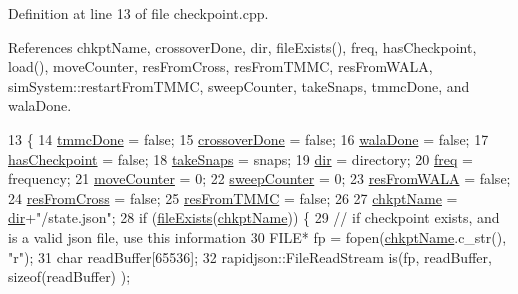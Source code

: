 Definition at line 13 of file checkpoint.\-cpp.



References chkpt\-Name, crossover\-Done, dir, file\-Exists(), freq, has\-Checkpoint, load(), move\-Counter, res\-From\-Cross, res\-From\-T\-M\-M\-C, res\-From\-W\-A\-L\-A, sim\-System\-::restart\-From\-T\-M\-M\-C, sweep\-Counter, take\-Snaps, tmmc\-Done, and wala\-Done.


\begin{DoxyCode}
13                                                                                                        \{
14     \hyperlink{classcheckpoint_acbe0c62aa82735741a9f396827966823}{tmmcDone} = \textcolor{keyword}{false};
15     \hyperlink{classcheckpoint_a4f13612ea6d376bb327295bfce3a70c5}{crossoverDone} = \textcolor{keyword}{false};
16     \hyperlink{classcheckpoint_aab066479e2ca6656d0031dd46a2fc1a5}{walaDone} = \textcolor{keyword}{false};
17     \hyperlink{classcheckpoint_aa75f306fcb0c2360d948fa3a61adfed5}{hasCheckpoint} = \textcolor{keyword}{false};
18     \hyperlink{classcheckpoint_a685226e8bae8084937f73f65c326c362}{takeSnaps} = snaps;
19     \hyperlink{classcheckpoint_a0e0f999ee8e0b09541e9131baa8a591d}{dir} = directory;
20     \hyperlink{classcheckpoint_a11a2d78eb0bf6045b659a4d18b53da44}{freq} = frequency;
21     \hyperlink{classcheckpoint_a5ab49a355714da4874aba00eb03f701d}{moveCounter} = 0;
22     \hyperlink{classcheckpoint_ad011ddbca1ea708321335b1b3ac67e07}{sweepCounter} = 0;
23     \hyperlink{classcheckpoint_a46f1c17d03901292f642ccad0a325d9e}{resFromWALA} = \textcolor{keyword}{false};
24     \hyperlink{classcheckpoint_ac3e65d26f2b8231ae9dd7e29c72ecf3b}{resFromCross} = \textcolor{keyword}{false};
25     \hyperlink{classcheckpoint_ab8f6081561b8c7871eea6743d4988d8a}{resFromTMMC} = \textcolor{keyword}{false};
26 
27     \hyperlink{classcheckpoint_a477eea21621f066889660ed426dc800f}{chkptName} = \hyperlink{classcheckpoint_a0e0f999ee8e0b09541e9131baa8a591d}{dir}+\textcolor{stringliteral}{"/state.json"};
28     \textcolor{keywordflow}{if} (\hyperlink{utilities_8cpp_a9d1e3672fd331d4185c1763c80226307}{fileExists}(\hyperlink{classcheckpoint_a477eea21621f066889660ed426dc800f}{chkptName})) \{
29         \textcolor{comment}{// if checkpoint exists, and is a valid json file, use this information}
30         FILE* fp = fopen(\hyperlink{classcheckpoint_a477eea21621f066889660ed426dc800f}{chkptName}.c\_str(), \textcolor{stringliteral}{"r"});
31         \textcolor{keywordtype}{char} readBuffer[65536];
32         rapidjson::FileReadStream is(fp, readBuffer, \textcolor{keyword}{sizeof}(readBuffer) );

\end{DoxyCode}
